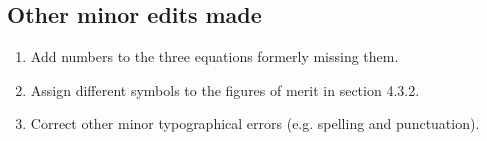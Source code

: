 \documentclass[a4paper,11pt]{article}
\begin{document}
\section{}
\subsection*{Other minor edits made}
\begin{enumerate}
  \item Add numbers to the three equations formerly missing them.
  \item Assign different symbols to the figures of merit in section 4.3.2.
  \item Correct other minor typographical errors (e.g. spelling and
        punctuation).
\end{enumerate}



\end{document}

